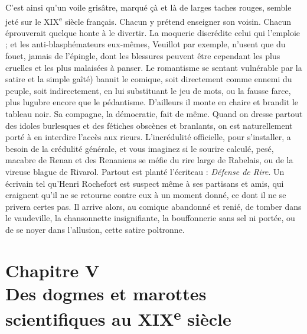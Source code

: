 \documentclass[french,twoside]{book} %
\newcommand\chapteropen{} %
\newcommand\chapterclose{} %
\renewcommand\chapteropen{} %
\renewcommand\chapterclose{} %
\begin{document}
C’est ainsi qu’un voile grisâtre, marqué çà et là de larges taches rouges, semble jeté sur le XIX\textsuperscript{e} siècle français. Chacun y prétend enseigner son voisin. Chacun éprouverait quelque honte à le divertir. La moquerie discrédite celui qui l’emploie ; et les anti-blasphémateurs eux-mêmes, Veuillot par exemple, n’usent que du fouet, jamais de l’épingle, dont les blessures peuvent être cependant les plus cruelles et les plus malaisées à panser. Le romantisme se sentant vulnérable par la satire et la simple gaîté) bannit le comique, soit directement comme ennemi du peuple, soit indirectement, en lui substituant le jeu de mots, ou la fausse farce, plus lugubre encore que le pédantisme. D’ailleurs il monte en chaire et brandit le tableau noir. Sa compagne, la démocratie, fait de même. Quand on dresse partout des idoles burlesques et des fétiches obscènes et branlants, on est naturellement porté à en interdire l’accès aux rieurs. L’incrédulité officielle, pour s’installer, a besoin de la crédulité générale, et vous imaginez si le sourire calculé, pesé, macabre de Renan et des Renaniens se méfie du rire large de Rabelais, ou de la vireuse blague de Rivarol. Partout est planté l’écriteau : {\itshape Défense de Rire}. Un écrivain tel qu’Henri Rochefort est suspect même à ses partisans et amis, qui craignent qu’il ne se retourne contre eux à un moment donné, ce dont il ne se privera certes pas. Il arrive alors, au comique abandonné et renié, de tomber dans le vaudeville, la chansonnette insignifiante, la bouffonnerie sans sel ni portée, ou de se noyer dans l’allusion, cette satire poltronne.
\chapterclose


\chapteropen
\chapter[Chapitre V. Des dogmes et marottes scientifiques au XIXe siècle]{Chapitre V{\hskip1pt}\\{}Des dogmes et marottes scientifiques au XIX\textsuperscript{e} siècle}
\end{document}
